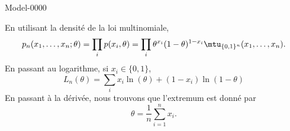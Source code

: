 
\begin{corrige}{Model-0000}

    En utilisant la densité de la loi multinomiale,
    \begin{equation}
        p_n(x_1,\ldots,x_n;\theta)=\prod_ip(x_i,\theta)=\prod_i\theta^{x_i}(1-\theta)^{1-x_i}\mtu_{\{ 0,1 \}^n}(x_1,\ldots,x_n).
    \end{equation}
    En passant au logarithme, si \( x_i\in\{ 0,1 \}\),
    \begin{equation}
        L_n(\theta)=\sum_i x_i\ln(\theta)+(1-x_i)\ln(1-\theta)
    \end{equation}
    En passant à la dérivée, nous trouvons que l'extremum est donné par
    \begin{equation}
        \theta=\frac{1}{ n }\sum_{i=1}^nx_i.
    \end{equation}
\end{corrige}
